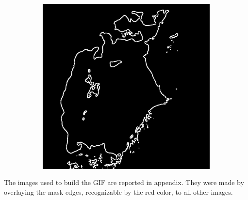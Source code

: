 \begin{figure}[H]
\begin{subfigure}[b]{.45\textwidth}
        \includegraphics[width=\textwidth]{../img/1977_edge_red.jpg}
        \caption{}
    \end{subfigure}
    \caption{}
    \label{fig:edges}
\end{figure}
The images used to build the GIF are reported in appendix. They were made by overlaying the mask edges, recognizable by the red color, to all other images.
